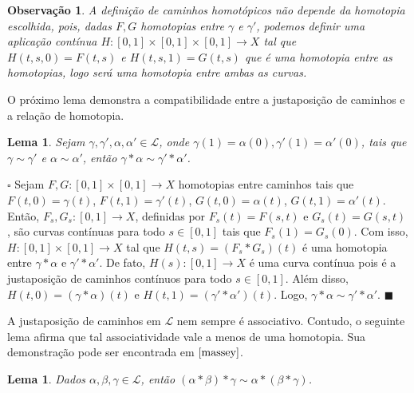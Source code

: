 \documentclass[12pt]{book}
\newtheorem{lema}[teorema]{Lema}
\newtheorem{observacao}[teorema]{Observação}
\newenvironment{prova}[1]{$\square$ #1}{\hfill$\blacksquare$}
\newcommand{\caminhos}{\mathcal{L}}
\newcommand{\intervalo}{[0,1]}
\begin{document}
	\begin{observacao}
		A definição de caminhos homotópicos não depende da homotopia escolhida, pois, dadas $F,G$ homotopias entre $\gamma$ e $\gamma'$, podemos definir uma aplicação contínua $H: [0,1] \times [0,1] \times [0,1] \to X$ tal que $H(t,s ,0) = F(t,s)$ e $H(t,s, 1) = G(t,s)$ que é uma homotopia entre as homotopias, logo será uma homotopia entre ambas as curvas.
	\end{observacao}
	
	O próximo lema demonstra a compatibilidade entre a justaposição de caminhos e a relação de homotopia.
	
	\begin{lema}\label{lema_compatibilidade_produto_caminhos}
		Sejam $\gamma, \gamma', \alpha, \alpha' \in \caminhos$, onde $\gamma(1) = \alpha(0), \gamma'(1) = \alpha'(0) $, tais que $\gamma \sim \gamma'$ e $\alpha \sim \alpha'$, então $\gamma * \alpha \sim \gamma' * \alpha'$.
	\end{lema}
	\begin{prova}
		Sejam  $F, G:[0,1] \times [0,1] \to X$ homotopias entre caminhos tais que $F(t,0)=\gamma(t)$, $F(t,1)=\gamma'(t)$, $G(t,0)=\alpha(t)$, $G(t,1)=\alpha'(t)$. Então, $F_{s}, G_{s}:\intervalo \to X$, definidas por $F_{s}(t) = F(s,t)$ e $G_{s}(t) = G(s,t)$, são curvas contínuas para todo $s \in \intervalo$ tais que $F_{s}(1) = G_{s}(0)$. Com isso, $H :\intervalo\times \intervalo\to X$ tal que $H(t, s)=(F_{s}*G_{s})(t)$ é uma homotopia entre $\gamma*\alpha$ e $\gamma'*\alpha'$. De fato, $H(s) :\intervalo\to X$ é uma curva contínua pois é a justaposição de caminhos contínuos para todo $s \in \intervalo$. Além disso, $H(t, 0) = (\gamma*\alpha)(t)$ e $H(t, 1) = (\gamma'*\alpha')(t)$. Logo, $\gamma*\alpha \sim \gamma'*\alpha'$.
	\end{prova}
	
	A justaposição de caminhos em $\caminhos$ nem sempre é associativo. Contudo, o seguinte lema afirma que tal associatividade vale a menos de uma homotopia. Sua demonstração pode ser encontrada em $\cite{massey}$.
	
	\begin{lema}\label{lema_associatividade_produto_caminhos}
		Dados $\alpha, \beta, \gamma\in \caminhos$, então $(\alpha*\beta)*\gamma \sim \alpha*(\beta*\gamma)$.
	\end{lema}
	
\end{document}
